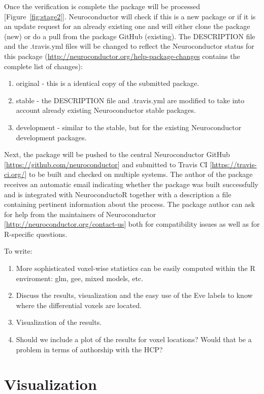 \documentclass[]{elsarticle} %
\begin{document}
Once the verification is complete the package will be processed [Figure~\ref{fig:stage2}]. Neuroconductor will check if this is a new package or if it is an update request for an already existing one and will either clone the package (new) or do a pull from the package GitHub (existing). The DESCRIPTION file and the .travis.yml files will be changed to reflect the Neuroconductor status for this package (\url{http://neuroconductor.org/help-package-changes} contains the complete list of changes):
\begin{enumerate}
\item original - this is a identical copy of the submitted package.
\item stable - the DESCRIPTION file and .travis.yml are modified to take into account already existing Neuroconductor stable packages.
\item development - similar to the stable, but for the existing Neuroconductor development packages.
\end{enumerate}
Next, the package will be pushed to the central Neuroconductor GitHub [\url{https://github.com/neuroconductor}] and submitted to Travis CI [\url{https://travis-ci.org/}] to be built and checked on multiple systems. The author of the package receives an automatic email indicating whether the package was built successfully and is integrated with NeuroconductoR together with a description a file containing pertinent information about the process. The package author can ask for help from the maintainers of Neuroconductor [\url{http://neuroconductor.org/contact-us}] both for compatibility issues as well as for R-specific questions. 

To write:
\begin{enumerate}
\item More sophisticated voxel-wise statistics can be easily computed within the R enviroment: glm, gee, mixed models, etc. 
\item Discuss the results, visualization and the easy use of the Eve labels to know where the differential voxels are located. 
\item Visualization of the results.
\item Should we include a plot of the results for voxel locations? Would that be a problem in terms of authorship with the HCP?
\end{enumerate}

\section{Visualization}\label{sec:visualization}
\end{document}
